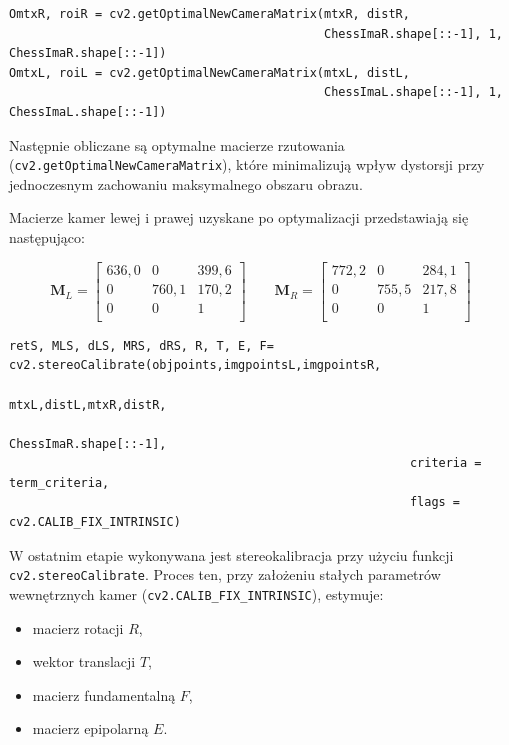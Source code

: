 \documentclass[magisterska]{pracadypl}
\begin{document}
\begin{lstlisting}[style=mypython]
OmtxR, roiR = cv2.getOptimalNewCameraMatrix(mtxR, distR,
                                            ChessImaR.shape[::-1], 1, ChessImaR.shape[::-1])
OmtxL, roiL = cv2.getOptimalNewCameraMatrix(mtxL, distL, 
                                            ChessImaL.shape[::-1], 1, ChessImaL.shape[::-1])
\end{lstlisting}

Następnie obliczane są optymalne macierze rzutowania (\texttt{cv2.getOptimalNewCameraMatrix}), które minimalizują wpływ dystorsji przy jednoczesnym zachowaniu maksymalnego obszaru obrazu.

Macierze kamer lewej i prawej uzyskane po optymalizacji przedstawiają się następująco:

\[
\mathbf{M}_L =
\begin{bmatrix}
636,0 & 0 & 399,6 \\
0 & 760,1 & 170,2 \\
0 & 0 & 1 \\
\end{bmatrix}
\qquad
\mathbf{M}_R =
\begin{bmatrix}
772,2 & 0 & 284,1 \\
0 & 755,5 & 217,8 \\
0 & 0 & 1 \\
\end{bmatrix}
\]

\begin{lstlisting}[style=mypython]
retS, MLS, dLS, MRS, dRS, R, T, E, F= cv2.stereoCalibrate(objpoints,imgpointsL,imgpointsR,
                                                        mtxL,distL,mtxR,distR,
                                                        ChessImaR.shape[::-1],
                                                        criteria = term_criteria,
                                                        flags = cv2.CALIB_FIX_INTRINSIC)
\end{lstlisting}

W ostatnim etapie wykonywana jest stereokalibracja przy użyciu funkcji \texttt{cv2.stereoCalibrate}.
Proces ten, przy założeniu stałych parametrów wewnętrznych kamer (\texttt{cv2.CALIB\_FIX\_INTRINSIC}), estymuje:

\begin{itemize}
    \item macierz rotacji $R$,
    \item wektor translacji $T$,
    \item macierz fundamentalną $F$,
    \item macierz epipolarną $E$.
\end{itemize}
\end{document}
